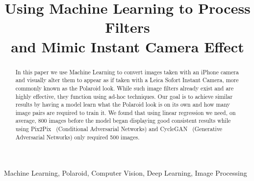 \documentclass[conference]{IEEEtran}
\begin{document}
\title{Using Machine Learning to Process Filters \\ and Mimic Instant Camera Effect \\}


\author{
\and
{}
}


\maketitle

\begin{abstract}
In this paper we use Machine Learning to convert images taken with an iPhone camera and visually alter them to appear as if taken with a Leica Sofort Instant Camera, more commonly known as the Polaroid look. 
While such image filters already exist and are highly effective, they function using ad-hoc techniques. 
Our goal is to achieve similar results by having a model learn what the Polaroid look is on its own and how many image pairs are required to train it. 
We found that using linear regression we need, on average, 800 images before the model began displaying good consistent results while using Pix2Pix~\cite{isola2017image} (Conditional Adversarial Networks) and CycleGAN~\cite{NIPS2014_5423} (Generative Adversarial Networks) only required 500 images.
\end{abstract}

\begin{IEEEkeywords}
  Machine Learning, Polaroid, Computer Vision, Deep Learning, Image Processing
\end{IEEEkeywords}

%
\IEEEpeerreviewmaketitle
\end{document}
